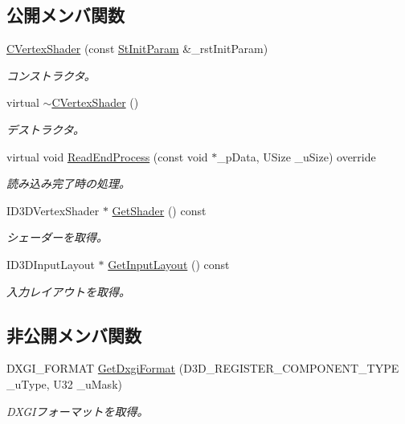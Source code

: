 \subsection*{公開メンバ関数}
\begin{DoxyCompactItemize}
\item 
\hyperlink{class_c_vertex_shader_abe43f0c4eb007a656660fe85c6c7d759}{C\+Vertex\+Shader} (const \hyperlink{struct_c_vertex_shader_1_1_st_init_param}{St\+Init\+Param} \&\+\_\+rst\+Init\+Param)
\begin{DoxyCompactList}\small\item\em コンストラクタ。 \end{DoxyCompactList}\item 
virtual \hyperlink{class_c_vertex_shader_aecd16374bc117e251052ee75c67417c8}{$\sim$\+C\+Vertex\+Shader} ()
\begin{DoxyCompactList}\small\item\em デストラクタ。 \end{DoxyCompactList}\item 
virtual void \hyperlink{class_c_vertex_shader_a6e640bce4b58ca267c39b9287a973c3b}{Read\+End\+Process} (const void $\ast$\+\_\+p\+Data, U\+Size \+\_\+u\+Size) override
\begin{DoxyCompactList}\small\item\em 読み込み完了時の処理。 \end{DoxyCompactList}\item 
I\+D3\+D\+Vertex\+Shader $\ast$ \hyperlink{class_c_vertex_shader_a955aa28538cac1841a22245f088c604a}{Get\+Shader} () const 
\begin{DoxyCompactList}\small\item\em シェーダーを取得。 \end{DoxyCompactList}\item 
I\+D3\+D\+Input\+Layout $\ast$ \hyperlink{class_c_vertex_shader_a5b387308b2743e82c735507690c96307}{Get\+Input\+Layout} () const 
\begin{DoxyCompactList}\small\item\em 入力レイアウトを取得。 \end{DoxyCompactList}\end{DoxyCompactItemize}
\subsection*{非公開メンバ関数}
\begin{DoxyCompactItemize}
\item 
D\+X\+G\+I\+\_\+\+F\+O\+R\+M\+A\+T \hyperlink{class_c_vertex_shader_a5edf12786a3cde69a7ec082433a46562}{Get\+Dxgi\+Format} (D3\+D\+\_\+\+R\+E\+G\+I\+S\+T\+E\+R\+\_\+\+C\+O\+M\+P\+O\+N\+E\+N\+T\+\_\+\+T\+Y\+P\+E \+\_\+u\+Type, U32 \+\_\+u\+Mask)
\begin{DoxyCompactList}\small\item\em D\+X\+G\+Iフォーマットを取得。 \end{DoxyCompactList}\end{DoxyCompactItemize}
